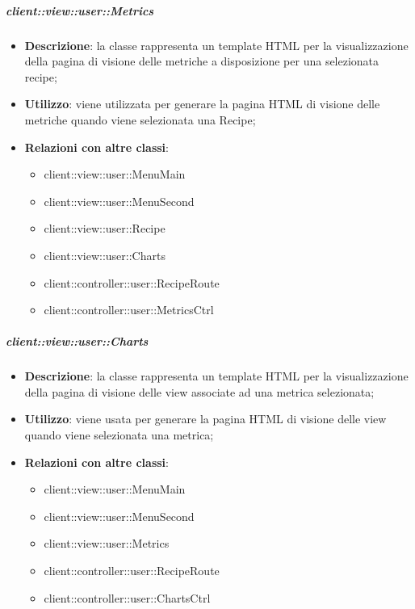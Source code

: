 		\subparagraph{client::view::user::Metrics} %
		\label{subp:bdsm_app_client_view_metrics}
			\begin{itemize}
				\item \textbf{Descrizione}: la classe rappresenta un template HTML per la visualizzazione della pagina di visione delle metriche a disposizione per una selezionata recipe;
				\item \textbf{Utilizzo}: viene utilizzata per generare la pagina HTML di visione delle metriche quando viene selezionata una Recipe;
				\item \textbf{Relazioni con altre classi}:
					\begin{itemize}
						\item client::view::user::MenuMain
						\item client::view::user::MenuSecond
						\item client::view::user::Recipe
						\item client::view::user::Charts
						\item client::controller::user::RecipeRoute
						\item client::controller::user::MetricsCtrl
					\end{itemize}
			\end{itemize}

		\subparagraph{client::view::user::Charts} %
		\label{subp:bdsm_app_client_view_user_charts}
			\begin{itemize}
				\item \textbf{Descrizione}: la classe rappresenta un template HTML per la visualizzazione della pagina di visione delle view associate ad una metrica selezionata;
				\item \textbf{Utilizzo}: viene usata per generare la pagina HTML di visione delle view quando viene selezionata una metrica;
				\item \textbf{Relazioni con altre classi}:
					\begin{itemize}
						\item client::view::user::MenuMain
						\item client::view::user::MenuSecond
						\item client::view::user::Metrics
						\item client::controller::user::RecipeRoute
						\item client::controller::user::ChartsCtrl
					\end{itemize}
			\end{itemize}


